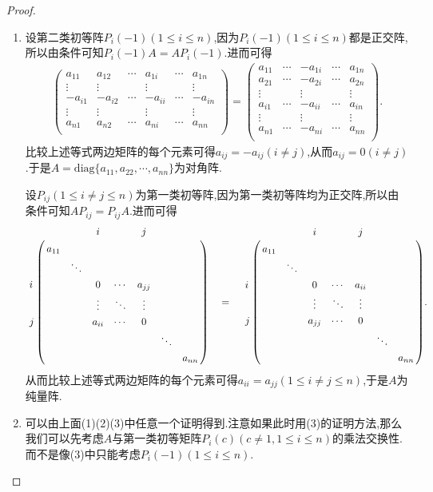 \documentclass[../../main.tex]{subfiles}%
\begin{document}
\begin{proof}
\begin{enumerate}
\item 设第二类初等阵\(P_{i}(-1)(1\leqslant  i\leqslant  n)\),因为$P_{i}(-1)(1\leqslant  i\leqslant  n)$都是正交阵,所以由条件可知$P_{i}(-1)A=AP_{i}(-1)$.进而可得
\begin{align*}
\left( \begin{matrix}
a_{11}&		a_{12}&		\cdots&		a_{1i}&		\cdots&		a_{1n}\\
\vdots&		\vdots&		&		\vdots&		&		\vdots\\
-a_{i1}&		-a_{i2}&		\cdots&		-a_{ii}&		\cdots&		-a_{in}\\
\vdots&		\vdots&		&		\vdots&		&		\vdots\\
a_{n1}&		a_{n2}&		\cdots&		a_{ni}&		\cdots&		a_{nn}\\
\end{matrix} \right) =\left( \begin{matrix}
a_{11}&		\cdots&		-a_{1i}&		\cdots&		a_{1n}\\
a_{21}&		\cdots&		-a_{2i}&		\cdots&		a_{2n}\\
\vdots&		&		\vdots&		&		\vdots\\
a_{i1}&		\cdots&		-a_{ii}&		\cdots&		a_{in}\\
\vdots&		&		\vdots&		&		\vdots\\
a_{n1}&		\cdots&		-a_{ni}&		\cdots&		a_{nn}\\
\end{matrix} \right) .
\end{align*}
比较上述等式两边矩阵的每个元素可得$a_{ij}=-a_{ij}\left( i\ne j \right) $,从而$a_{ij}=0\left( i\ne j \right) $.于是\(A=\text{diag}\{a_{11},a_{22},\cdots,a_{nn}\}\)为对角阵.

设\(P_{ij}(1\leqslant  i\neq j\leqslant  n)\)为第一类初等阵,因为第一类初等阵均为正交阵,所以由条件可知\(AP_{ij}=P_{ij}A\).进而可得
\begin{align*}
\bordermatrix{%
&    &		&		i&		&		j&		&		\cr
&    a_{11}&		&		&		&		&		&		\cr
&    &		\ddots&		&		&		&		&		\cr
i&    &		&		0&		\cdots&		a_{jj}&		&		\cr
&   &		&		\vdots&		\ddots&		\vdots&		&		\cr
j&    &		&		a_{ii}&		\cdots&		0&		&		\cr
&    &		&		&		&		&		\ddots&		\cr
&    &		&		&		&		&		&		a_{nn}\cr
} \quad =\quad \bordermatrix{%
&    &		&		i&		&		j&		&		\cr
&    a_{11}&		&		&		&		&		&		\cr
&    &		\ddots&		&		&		&		&		\cr
i&    &		&		0&		\cdots&		a_{ii}&		&		\cr
&    &		&		\vdots&		\ddots&		\vdots&		&		\cr
j&   &		&		a_{jj}&		\cdots&		0&		&		\cr
&    &		&		&		&		&		\ddots&		\cr
&    &		&		&		&		&		&		a_{nn}\cr
} .
\end{align*}
从而比较上述等式两边矩阵的每个元素可得\(a_{ii}=a_{jj}(1\leqslant  i\neq j\leqslant  n)\),于是\(A\)为纯量阵.

\item 可以由上面(1)(2)(3)中任意一个证明得到.注意如果此时用(3)的证明方法,那么我们可以先考虑$A$与第一类初等矩阵\(P_{i}(c)(c\ne 1,1\leqslant  i\leqslant  n)\)的乘法交换性.而不是像(3)中只能考虑\(P_{i}(-1)(1\leqslant  i\leqslant  n)\).
\end{enumerate}
\end{proof}
\end{document}
